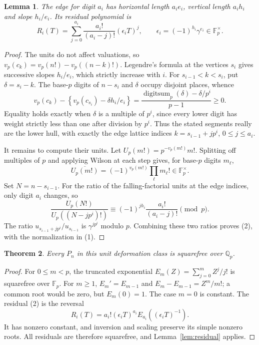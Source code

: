 \documentclass[11pt]{article}
\newtheorem{theorem}{Theorem}
\newtheorem{lemma}[theorem]{Lemma}
\newcommand{\Q}{\mathbb Q}
\newcommand{\F}{\mathbb F}
\newcommand{\vp}{v_p}
\begin{document}
\begin{lemma}\label{lem:edges}
The edge for digit $a_i$ has horizontal length $a_ie_i$, vertical length
$a_ih_i$ and slope $h_i/e_i$. Its residual polynomial is
\[
 R_i(T)=\sum_{j=0}^{a_i}
       \frac{a_i!}{(a_i-j)!}(\epsilon_iT)^j,
 \qquad \epsilon_i=(-1)^{h_i}\gamma^{e_i}\in\F_p^\times. \tag{2}
\]
\end{lemma}
\begin{proof}
The units do not affect valuations, so
$\vp(c_k)=\vp(n!)-\vp((n-k)!)$.
Legendre's formula at the vertices $s_i$ gives successive slopes
$h_i/e_i$, which strictly increase with $i$.
For $s_{i-1}<k<s_i$, put $\delta=s_i-k$.
The base-$p$ digits of $n-s_i$ and $\delta$ occupy disjoint places, whence
\[
 \vp(c_k)-\left\{\vp(c_{s_i})-\delta h_i/e_i\right\}
 =\frac{\operatorname{digitsum}_p(\delta)-\delta/p^i}{p-1}\ge0.
\]
Equality holds exactly when $\delta$ is a multiple of $p^i$, since every
lower digit has weight strictly less than one after division by $p^i$.
Thus the stated segments really are the lower hull, with exactly the
edge lattice indices $k=s_{i-1}+jp^i$, $0\le j\le a_i$.

It remains to compute their units. Let
$U_p(m!)=p^{-\vp(m!)}m!$. Splitting off multiples of $p$ and applying
Wilson at each step gives, for base-$p$ digits $m_\ell$,
\[
 \overline{U_p(m!)}=(-1)^{\vp(m!)}\prod_\ell m_\ell!\in\F_p^\times.
\]
Set $N=n-s_{i-1}$. For the ratio of the falling-factorial units at the
edge indices, only digit $a_i$ changes, so
\[
 \frac{U_p(N!)}{U_p((N-jp^i)!)}
   \equiv(-1)^{jh_i}\frac{a_i!}{(a_i-j)!}\pmod p.
\]
The ratio $u_{s_{i-1}+jp^i}/u_{s_{i-1}}$ is $\gamma^{jp^i}$ modulo $p$.
Combining these two ratios proves (2), with the normalization in (1).
\end{proof}

\begin{theorem}\label{thm:deformation}
Every $P_n$ in this unit deformation class is squarefree over $\Q_p$.
\end{theorem}
\begin{proof}
For $0\le m<p$, the truncated exponential
$E_m(Z)=\sum_{j=0}^m Z^j/j!$ is squarefree over $\F_p$.
For $m\ge1$, $E_m'=E_{m-1}$ and
$E_m-E_{m-1}=Z^m/m!$; a common root would be zero, but $E_m(0)=1$.
The case $m=0$ is constant. The residual (2) is the reversal
\[
 R_i(T)=a_i!(\epsilon_iT)^{a_i}
                 E_{a_i}((\epsilon_iT)^{-1}).
\]
It has nonzero constant, and inversion and scaling preserve its simple
nonzero roots. All residuals are therefore squarefree, and
Lemma~\ref{lem:residual} applies.
\end{proof}
\end{document}
